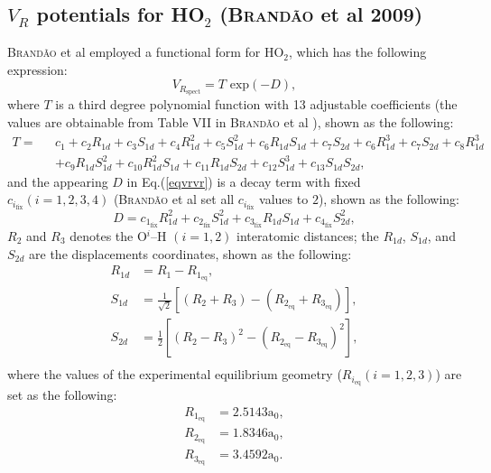 \documentclass[12pt]{article}
\begin{document}
\subsection{$V_R$ potentials for HO$_2$ (\textsc{Brandão} et al 2009)}
\label{subvr}
\textsc{Brandão} et al \cite{idx155} employed a functional form for HO$_2$, which has the following expression:
\begin{equation}
    V_{R_{\text{spect}}} = T \text{ exp}(-D),
\label{eqvrvr}
\end{equation}
where $T$ is a third degree polynomial function with 13 adjustable coefficients (the values are obtainable from Table VII in \textsc{Brandão} et al \cite{idx155}), shown as the following:
\begin{equation}
    \begin{split}
        T = \text{ }& c_1 + c_2R_{1d} + c_3S_{1d} + c_4R^2_{1d} + c_5S^2_{1d} + c_6R_{1d}S_{1d} + c_7S_{2d} + c_6R^3_{1d} + c_7S_{2d} + c_8R^3_{1d}\\& + c_9R_{1d}S^2_{1d} + c_{10}R^2_{1d}S_{1d} + c_{11}R_{1d}S_{2d} + c_{12}S^3_{1d} + c_{13}S_{1d}S_{2d},
    \end{split}
    \label{eqvrt}
\end{equation}
and the appearing $D$ in Eq.(\ref{eqvrvr}) is a decay term with fixed $c_{i_{\text{fix}}} (i=1,2,3,4)$ (\textsc{Brandão} et al \cite{idx155} set all $c_{i_{\text{fix}}}$ values to $2$), shown as the following:
\begin{equation}
    D = c_{1_{\text{fix}}}R^2_{1d} + c_{2_{\text{fix}}}S^2_{1d} + c_{3_{\text{fix}}}R_{1d}S_{1d} + c_{4_{\text{fix}}}S^2_{2d},
    \label{eqvrd}
\end{equation}
$R_2$ and $R_3$ denotes the O$^i$--H $(i=1,2)$ interatomic distances; the $R_{1d}$, $S_{1d}$, and $S_{2d}$ are the displacements coordinates, shown as the following:
\begin{equation}
    \begin{split}
        R_{1d} &= R_1 - R_{1_{\text{eq}}}, \\
        S_{1d} &= \frac{1}{\sqrt{2}}\left[(R_2+R_3)-(R_{2_{\text{eq}}} + R_{3_{\text{eq}}})\right], \\
        S_{2d} &= \frac{1}{2}\left[(R_2-R_3)^2-(R_{2_{\text{eq}}} - R_{3_{\text{eq}}})^2\right], \\
    \end{split}
    \label{eqvrdisplacement}
\end{equation}
where the values of the experimental equilibrium geometry ($R_{i_{\text{eq}}} (i=1,2,3)$) are set as the following: 
\begin{equation}
    \begin{split}
        R_{1_{\text{eq}}} &= 2.5143\text{a}_0,\\
        R_{2_{\text{eq}}} &= 1.8346\text{a}_0,\\
        R_{3_{\text{eq}}} &= 3.4592\text{a}_0.
    \end{split}
\end{equation}
\end{document}
